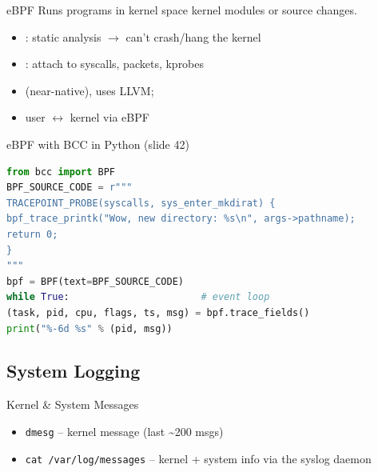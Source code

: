 
\begin{concept}{eBPF}
    Runs  programs in kernel space  kernel
    modules or source changes.
    \begin{itemize}
        \item {}: static analysis $\to$ can't crash/hang the kernel
        \item {}: attach to syscalls, packets, kprobes
        \item {} (near-native), uses LLVM; 
        \item user $\leftrightarrow$ kernel via eBPF 
    \end{itemize}
\end{concept}

\begin{examplecode}{eBPF with BCC in Python (slide 42)}
\begin{lstlisting}[language=Python, style=basesmol, aboveskip=2pt, belowskip=2pt]
from bcc import BPF
BPF_SOURCE_CODE = r"""
TRACEPOINT_PROBE(syscalls, sys_enter_mkdirat) {
bpf_trace_printk("Wow, new directory: %s\n", args->pathname);
return 0;
}
"""
bpf = BPF(text=BPF_SOURCE_CODE)
while True:                       # event loop
(task, pid, cpu, flags, ts, msg) = bpf.trace_fields()
print("%-6d %s" % (pid, msg))
\end{lstlisting}
\end{examplecode}

\subsection{System Logging}

\begin{definition}{Kernel \& System Messages}
    \begin{itemize}
        \item \texttt{dmesg} -- kernel message  (last \textasciitilde200 msgs)
        \item \texttt{cat /var/log/messages} -- kernel + system info via the syslog daemon
    \end{itemize}
\end{definition}

